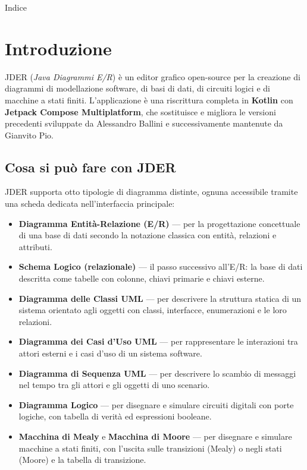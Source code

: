 \documentclass[a4paper,11pt]{article}
\makeatletter
\newcommand\mediumweight{\fontseries{mb}\selectfont}
\newcommand\headlinemedium{\fontsize{21}{27}\selectfont}
\newcommand\currenticon{book}
\newcommand\tocicon{book}
\newcommand\sectionicon[1]{%
  \renewcommand\currenticon{#1}%
  \addtocontents{toc}{\gdef\protect\tocicon{#1}}}
\newcommand\guidetoc{\@starttoc{toc}}
\newcommand\jder{{\mediumweight JDER}}
\makeatother
\begin{document}
{\headlinemedium\color{m3onsurface}Indice\par}
\vspace{6pt}
\begingroup
\hypersetup{hidelinks}
\guidetoc
\endgroup
\clearpage

\sectionicon{book}
\section{Introduzione}
\label{sec:intro}

\jder{} (\textit{Java Diagrammi E/R}) è un editor grafico open-source per la creazione di diagrammi
di modellazione software, di basi di dati, di circuiti logici e di macchine a stati finiti. L'applicazione è una riscrittura completa in \textbf{Kotlin}
con \textbf{Jetpack Compose Multiplatform}, che sostituisce e migliora le versioni precedenti
sviluppate da Alessandro Ballini e successivamente mantenute da Gianvito Pio.

\subsection{Cosa si può fare con JDER}

\jder{} supporta otto tipologie di diagramma distinte, ognuna accessibile tramite una scheda
dedicata nell'interfaccia principale:

\begin{itemize}
  \item \textbf{Diagramma Entità-Relazione (E/R)} --- per la progettazione concettuale di una
        base di dati secondo la notazione classica con entità, relazioni e attributi.
  \item \textbf{Schema Logico (relazionale)} --- il passo successivo all'E/R: la base di dati
        descritta come tabelle con colonne, chiavi primarie e chiavi esterne.
  \item \textbf{Diagramma delle Classi UML} --- per descrivere la struttura statica di un sistema
        orientato agli oggetti con classi, interfacce, enumerazioni e le loro relazioni.
  \item \textbf{Diagramma dei Casi d'Uso UML} --- per rappresentare le interazioni tra attori
        esterni e i casi d'uso di un sistema software.
  \item \textbf{Diagramma di Sequenza UML} --- per descrivere lo scambio di messaggi nel tempo
        tra gli attori e gli oggetti di uno scenario.
  \item \textbf{Diagramma Logico} --- per disegnare e simulare circuiti digitali con porte
        logiche, con tabella di verità ed espressioni booleane.
  \item \textbf{Macchina di Mealy} e \textbf{Macchina di Moore} --- per disegnare e simulare
        macchine a stati finiti, con l'uscita sulle transizioni (Mealy) o negli stati (Moore) e la
        tabella di transizione.
\end{itemize}
\end{document}
